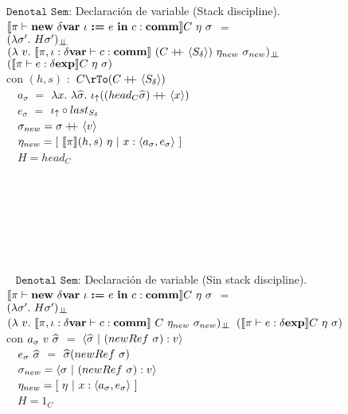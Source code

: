 \noindent
$\texttt{Denotal Sem:}$ Declaraci\'on de variable (Stack discipline).\\

$\llbracket \pi \vdash \textbf{new} \ \delta \textbf{var} \ \iota \ \textbf{:=} \ e \ \textbf{in} \ c : \textbf{comm} \rrbracket C \ \eta \ \sigma$ 
$=$ \\ \indent \indent
$(\lambda \sigma' . \ H \sigma')_{\bot \!\!\! \bot}$\\ \indent \indent \indent
$(\lambda \ v . \ \semBrcks{\pi,\iota:\deltavar \vdash c : \commt}
		\ (C\concat\lrangles{S_\delta}) \ \eta_{new} \ \sigma_{new})_{\dbot}$
\\ \indent \indent  \indent  \indent  \indent \indent  \indent
\indent \indent \indent \indent \indent \indent \indent
\indent \indent \indent
$(\semBrcks{\pi \vdash e : \deltaexp}C \ \eta \ \sigma)$\\

con $(h,s)$ $:$ $C \rTo (C \concat \lrangles{S_\delta})$ \\
\indent \indent \ \
$a_\sigma$ $=$ $\lambda x. \ \lambda \widehat{\sigma} . \ \iota_{\uparrow} ((head_{C} \widehat{\sigma}) +\kern-1.3ex+\kern0.8ex \langle x \rangle)$\\
\indent \indent \ \
$e_\sigma$ $=$ $ \iota_{\uparrow} \circ last_{S_\delta}$\\
\indent \indent \ \
$\sigma_{new} = \sigma +\kern-1.3ex+\kern0.8ex \langle v \rangle $\\
\indent \indent \ \
$\eta_{new} = [ \ \llbracket \pi \rrbracket(h,s) \ \eta \ | \ x:\langle a_\sigma,e_\sigma \rangle \ ]$\\
\indent \indent \ \
$H = head_C$\\

\

\

\

\

\
\noindent
$\texttt{Denotal Sem:}$ Declaraci\'on de variable (Sin stack discipline).\\

$\llbracket \pi \vdash \textbf{new} \ \delta \textbf{var} \ \iota \ \textbf{:=} \ e \ \textbf{in} \ c : \textbf{comm} \rrbracket C \ \eta \ \sigma$ 
$=$ \\ \indent \indent
$(\lambda \sigma' . \ H \sigma')_{\bot \!\!\! \bot}$\\ \indent \indent \indent
$(\lambda \ v . \ \semBrcks{\pi,\iota:\deltavar \vdash c : \commt}
		\ C \ \eta_{new} \ \sigma_{new})_{\dbot}$
$(\semBrcks{\pi \vdash e : \deltaexp}C \ \eta \ \sigma)$\\

con 
$a_\sigma \ v \ \widehat{\sigma}$ $=$ $ \lrangles{\sigmahat \ | \ (newRef \ \sigma):v} $\\
\indent \indent \ \
$e_\sigma \ \widehat{\sigma}$ $=$ $\widehat{\sigma}(newRef \ \sigma)$\\
\indent \indent \ \
$\sigma_{new} = \lrangles{\sigma \ | \ (newRef \ \sigma):v}$\\
\indent \indent \ \
$\eta_{new} = [ \ \eta \ | \ x:\lrangles{a_\sigma,e_\sigma} \ ]$\\
\indent \indent \ \
$H = 1_C$\\
